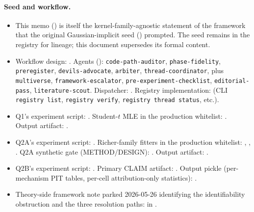 \documentclass[11pt]{article}
\theoremstyle{definition}
\theoremstyle{plain}
\begin{document}
\paragraph{Seed and workflow.}
\begin{itemize}[leftmargin=2em]
\item This memo
() is itself the
kernel-family-agnostic statement of the framework that the
original Gaussian-implicit seed
() prompted. The
seed remains in the registry for lineage; this document supersedes
its formal content.
\item Workflow design:
.
Agents ():
\texttt{code-path-auditor},
\texttt{phase-fidelity},
\texttt{preregister},
\texttt{devils-advocate},
\texttt{arbiter},
\texttt{thread-coordinator},
plus
\texttt{multiverse},
\texttt{framework-escalator},
\texttt{pre-experiment-checklist},
\texttt{editorial-pass},
\texttt{literature-scout}.
Dispatcher: .
Registry implementation: 
(CLI \texttt{registry list}, \texttt{registry verify},
\texttt{registry thread status}, etc.).
\item Q1's experiment script:
.
Student-$t$ MLE in the production whitelist:
.
Output artifact:
.
\item Q2A's experiment script:
.
Richer-family fitters in the production whitelist:
,
,
.
Q2A synthetic gate (METHOD/DESIGN):
.
Output artifact:
.
\item Q2B's experiment script:
.
Primary CLAIM artifact:
.
Output pickle (per-mechanism PIT tables, per-cell attribution-only
statistics):
.
\item Theory-side framework note parked 2026-05-26 identifying the
identifiability obstruction and the three resolution paths:
 in
.
\end{itemize}
\end{document}
